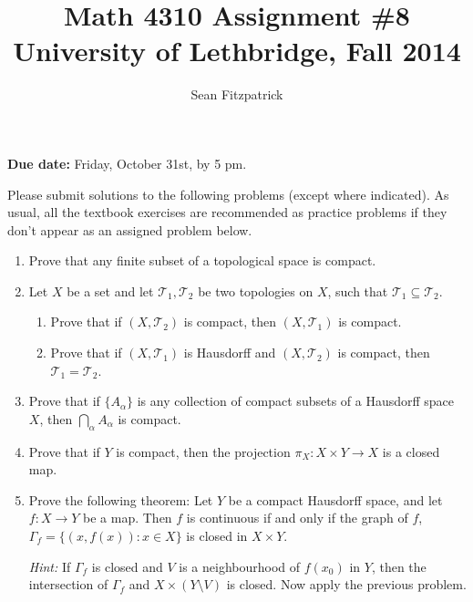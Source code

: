 \documentclass[letterpaper,12pt]{article}
\title{Math 4310 Assignment \#8\\University of Lethbridge, Fall 2014}
\author{Sean Fitzpatrick}
\newcommand{\T}{\mathcal{T}}
\begin{document}
 \maketitle

{\bf Due date:} Friday, October 31st, by 5 pm.

\bigskip

Please submit solutions to the following problems (except where indicated). As usual, all the textbook exercises are recommended as practice problems if they don't appear as an assigned problem below.

\begin{enumerate}
\item Prove that any finite subset of a topological space is compact.
\item Let $X$ be a set and let $\T_1, \T_2$ be two topologies on $X$, such that $\T_1\subseteq \T_2$.
\begin{enumerate}
 \item Prove that if $(X,\T_2)$ is compact, then $(X,\T_1)$ is compact.
 \item Prove that if $(X,\T_1)$ is Hausdorff and $(X,\T_2)$ is compact, then $\T_1=\T_2$.
\end{enumerate}
 \item Prove that if $\{A_\alpha\}$ is any collection of compact subsets of a Hausdorff space $X$, then $\bigcap_\alpha A_\alpha$ is compact.
 \item Prove that if $Y$ is compact, then the projection $\pi_X: X\times Y\to X$ is a closed map.
 \item Prove the following theorem: Let $Y$ be a compact Hausdorff space, and let $f:X\to Y$ be a map. Then $f$ is continuous if and only if the graph of $f$, $\Gamma_f = \{(x,f(x)) : x\in X\}$ is closed in $X\times Y$.

{\em Hint:} If $\Gamma_f$ is closed and $V$ is a neighbourhood of $f(x_0)$ in $Y$, then the intersection of $\Gamma_f$ and $X\times (Y\setminus V)$ is closed. Now apply the previous problem.
\end{enumerate}
\end{document}
